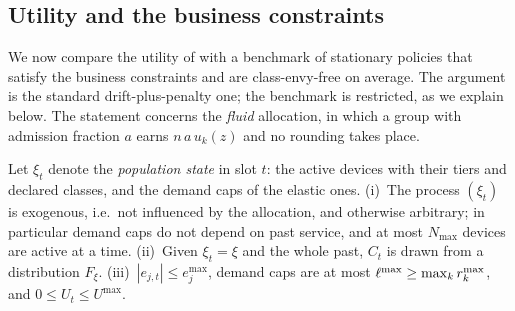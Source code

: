 \subsection{Utility and the business constraints}\label{sec:opt}

We now compare the utility of \repay{} with a benchmark of stationary policies that satisfy the business constraints and are class-envy-free on average. The argument is the standard drift-plus-penalty one; the benchmark is restricted, as we explain below.
The statement concerns the \emph{fluid} allocation, in which a group with admission fraction $a$ earns $n\,a\,u_k(z)$ and no rounding takes place.

\begin{assumption}\label{ass:model}
Let $\xi_t$ denote the \emph{population state} in slot $t$: the active devices with their tiers and declared classes, and the demand caps of the elastic ones.
(i)~The process $(\xi_t)$ is exogenous, i.e.\ not influenced by the allocation, and otherwise arbitrary; in particular demand caps do not depend on past service, and at most $N_{\max}$ devices are active at a time.
(ii)~Given $\xi_t=\xi$ and the whole past, $C_t$ is drawn from a distribution $F_\xi$.
(iii)~$|e_{j,t}|\le e_j^{\max}$, demand caps are at most $\ell^{\max}\ge\max_kr^{\max}_k$, and $0\le U_t\le U^{\max}$.
\end{assumption}

